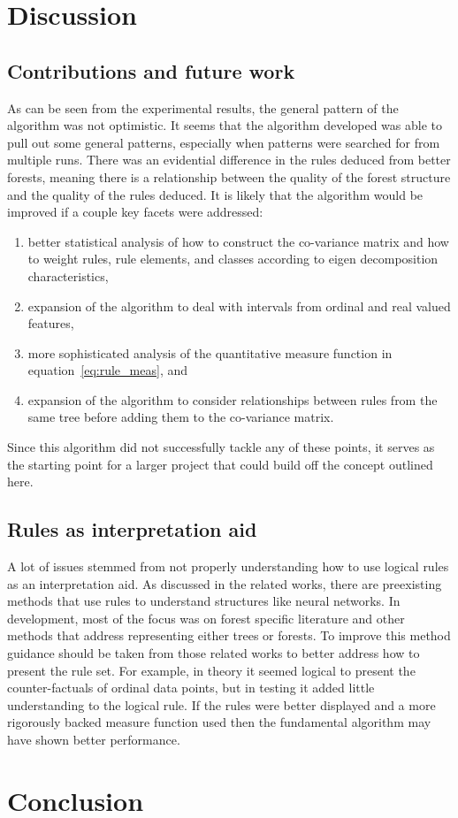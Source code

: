 \documentclass[10pt]{article}
\begin{document}

\section{Discussion}
\label{sec:dis}
\subsection{Contributions and future work}
As can be seen from the experimental results, the general pattern of the algorithm was not optimistic. It seems that the algorithm developed was able to pull out some general patterns, especially when patterns were searched for from multiple runs. There was an evidential difference in the rules deduced from better forests, meaning there is a relationship between the quality of the forest structure and the quality of the rules deduced. It is likely that the algorithm would be improved if a couple key facets were addressed:
\begin{enumerate}
\item better statistical analysis of how to construct the co-variance matrix and how to weight rules, rule elements, and classes according to eigen decomposition characteristics, 
\item expansion of the algorithm to deal with intervals from ordinal and real valued features,
\item more sophisticated analysis of the quantitative measure function in equation~\ref{eq:rule_meas}, and
\item expansion of the algorithm to consider relationships between rules from the same tree before adding them to the co-variance matrix. 
\end{enumerate}
Since this algorithm did not successfully tackle any of these points, it serves as the starting point for a larger project that could build off the concept outlined here. 

\subsection{Rules as interpretation aid}
A lot of issues stemmed from not properly understanding how to use logical rules as an interpretation aid. As discussed in the related works, there are preexisting methods that use rules to understand structures like neural networks. In development, most of the focus was on forest specific literature and other methods that address representing either trees or forests. To improve this method guidance should be taken from those related works to better address how to present the rule set. For example, in theory it seemed logical to present the counter-factuals of ordinal data points, but in testing it added little understanding to the logical rule. If the rules were better displayed and a more rigorously backed measure function used then the fundamental algorithm may have shown better performance. 


\section{Conclusion}
\label{sec:conc}




\vskip 0.2in

\end{document}
